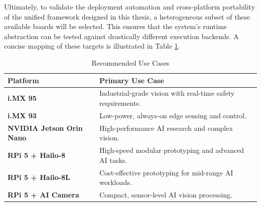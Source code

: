 Ultimately, to validate the deployment automation and cross-platform portability of the unified framework designed in this thesis, a heterogeneous subset of these available boards will be selected. This ensures that the system's runtime abstraction can be tested against drastically different execution backends. A concise mapping of these targets is illustrated in Table \ref{tab:recommendations}.

\begin{table}[H]
    \centering
    \caption{Recommended Use Cases}
    \label{tab:recommendations}
    \renewcommand{\arraystretch}{1.5}
    \begin{tabular}{p{} p{}}
        \toprule
        \textbf{Platform} & \textbf{Primary Use Case} \\
        \midrule
        \textbf{i.MX 95} & Industrial-grade vision with real-time safety requirements. \\
        \textbf{i.MX 93} & Low-power, always-on edge sensing and control. \\
        \textbf{NVIDIA Jetson Orin Nano} & High-performance \gls{AI} research and complex vision. \\
        \textbf{\gls{RPi} 5 + Hailo-8} & High-speed modular prototyping and advanced \gls{AI} tasks. \\
        \textbf{\gls{RPi} 5 + Hailo-8L} & Cost-effective prototyping for mid-range \gls{AI} workloads. \\
        \textbf{\gls{RPi} 5 + \gls{AI} Camera} & Compact, sensor-level \gls{AI} vision processing. \\
        \bottomrule
    \end{tabular}
\end{table}
